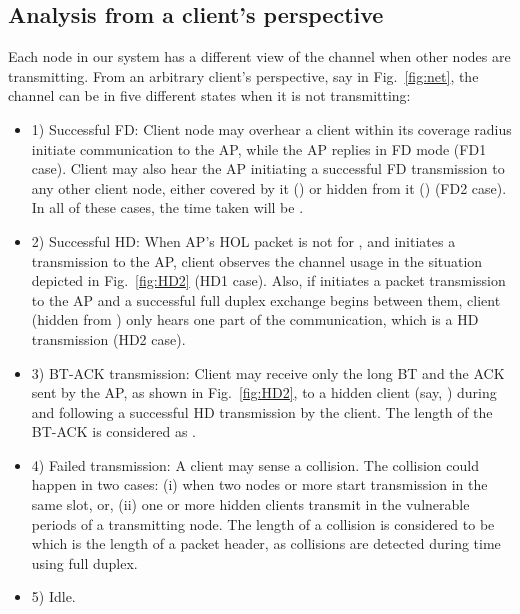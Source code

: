 \documentclass[10pt,journal,cspaper,compsoc]{IEEEtran}
\begin{document}
\subsection{Analysis from a client's perspective}
Each node in our system has a different view of the channel when other nodes are transmitting. From an arbitrary client's perspective, say  in Fig.~\ref{fig:net}, the channel can be in five different states when it is not transmitting: 
\begin{itemize}
\item 1) Successful FD: Client node  may overhear a client  within its coverage radius initiate communication to the AP, while the AP replies in FD mode (FD1 case). 
Client  may also hear the AP initiating a successful FD transmission to any other client node, either covered by it () or hidden from it () (FD2 case). In all of these cases, the time taken will be .  

\item 2) Successful HD:  When AP's HOL packet is not for , and  initiates a transmission to the AP, client  observes the channel usage in the situation depicted in Fig.~\ref{fig:HD2} (HD1 case). Also, if  initiates a packet transmission to the AP and a successful full duplex exchange begins between them, client  (hidden from ) only hears one part of the communication, which is a HD transmission (HD2 case). 

\item 3) BT-ACK transmission: Client  may receive only the long BT and the ACK sent by the AP, as shown in Fig.~\ref{fig:HD2}, to a hidden client (say, ) during and following a successful HD transmission by the client. The length of the BT-ACK is considered as .

\item 4) Failed transmission: A client may sense a collision. The collision could happen in two cases: (i) when two nodes or more start transmission in the same slot, or, (ii) one or more hidden clients transmit in the vulnerable periods of a transmitting node. The length of a collision is considered to be  which is the length of a packet header, as collisions are detected during time using full duplex. 
 
\item 5) Idle.
\end{itemize}
\end{document}
